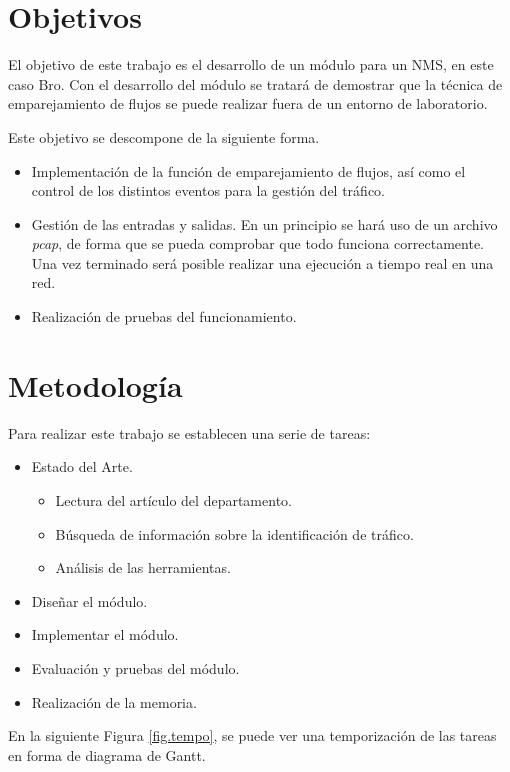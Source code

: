 \section{Objetivos}

El objetivo de este trabajo es el desarrollo de un módulo para un NMS, en este caso Bro. Con el desarrollo del módulo se tratará 
de demostrar que la técnica de emparejamiento de flujos se puede realizar fuera de un entorno de laboratorio.

\intro Este objetivo se descompone de la siguiente forma.

\begin{itemize}
\item Implementación de la función de emparejamiento de flujos, así como el control de los distintos eventos para la gestión del 
tráfico.
\item Gestión de las entradas y salidas. En un principio se hará uso de un archivo \textit{pcap}, de forma 
que se pueda comprobar que todo funciona correctamente. Una vez terminado será posible realizar una ejecución a tiempo real en una 
red.
\item Realización de pruebas del funcionamiento.
\end{itemize}

\section{Metodología}

Para realizar este trabajo se establecen una serie de tareas:

\begin{itemize}
\item Estado del Arte.
	\begin{itemize}
	\item Lectura del artículo del departamento. \cite{comparacion}
	\item Búsqueda de información sobre la identificación de tráfico.
	\item Análisis de las herramientas.
	\end{itemize}
\item Diseñar el módulo.
\item Implementar el módulo.
\item Evaluación y pruebas del módulo.
\item Realización de la memoria.
\end{itemize}

\intro En la siguiente Figura \ref{fig.tempo}, se puede ver una temporización de las tareas en forma de diagrama de Gantt.

